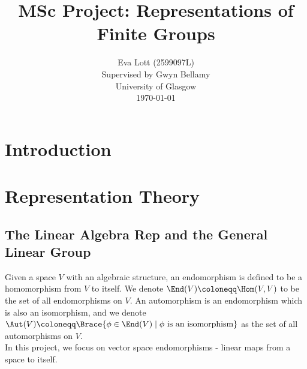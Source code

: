 
\usepackage[
backend=biber,
style=nature,
sorting=ynt
]{biblatex}


\usepackage{etoolbox}
\makeatletter
{}
\makeatother


\title{\textbf{MSc Project: Representations of Finite Groups}}
\author{Eva Lott (2599097L)\\Supervised by Gwyn Bellamy\\
	{University of Glasgow}\\ \today}
\date{}

\rhead{\thepage}
\chead{}
\cfoot{} %



\clearpage
\maketitle
\thispagestyle{empty}
\tableofcontents

\newpage
\setcounter{page}{1}
\section{Introduction}

\newpage
\section{Representation Theory}
\subsection{The Linear Algebra Rep and the General Linear Group}

\begin{defi}
	Given a space $V$ with an algebraic structure, an endomorphism is defined to be a homomorphism from $V$ to itself. We denote $\End(V) \coloneqq \Hom(V,V)$ to be the set of all endomorphisms on $V$. An automorphism is an endomorphism which is also an isomorphism, and we denote $\Aut(V) \coloneqq \Brace{\phi \in \End(V)\;|\;\phi \text{ is an isomorphism}}$ as the set of all automorphisms on $V$.\\

	In this project, we focus on vector space endomorphisms - linear maps from a space to itself.
\end{defi}




